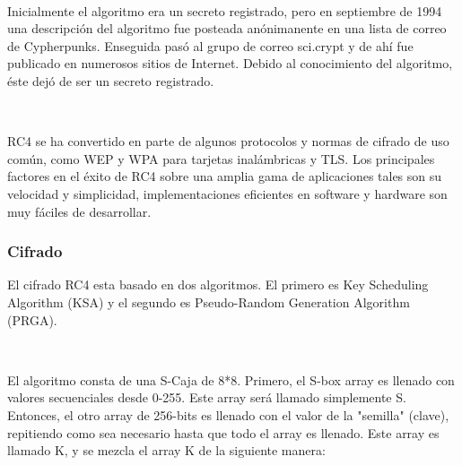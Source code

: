 \documentclass[11pt, conference]{IEEEtran}
\begin{document}
\

Inicialmente el algoritmo era un secreto registrado, pero en septiembre de 1994 una descripción del algoritmo fue posteada anónimanente en una lista de correo de Cypherpunks. Enseguida pasó al grupo de correo sci.crypt y de ahí fue publicado en numerosos sitios de Internet. Debido al conocimiento del algoritmo, éste dejó de ser un secreto registrado.

\

RC4 se ha convertido en parte de algunos protocolos y normas de cifrado de uso común, como WEP y WPA para tarjetas inalámbricas y TLS. Los principales factores en el éxito de RC4 sobre una amplia gama de aplicaciones tales son su velocidad y simplicidad, implementaciones eficientes en software y hardware son muy fáciles de desarrollar.

\subsubsection{Cifrado}

El cifrado RC4 esta basado en dos algoritmos. El primero es Key Scheduling Algorithm (KSA) y el segundo es Pseudo-Random Generation Algorithm (PRGA).

\

El algoritmo consta de una S-Caja de 8*8. Primero, el S-box array es llenado con valores secuenciales desde 0-255. Este array será llamado simplemente S. Entonces, el otro array de 256-bits es llenado con el valor de la "semilla" (clave), repitiendo como sea necesario hasta que todo el array es llenado. Este array es llamado K, y se mezcla el array K de la siguiente manera: 
\end{document}
